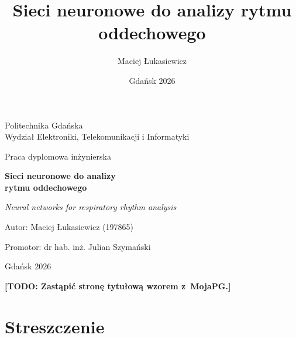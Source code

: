 \documentclass[12pt,a4paper,oneside]{report}
\title{Sieci neuronowe do analizy rytmu oddechowego}
\author{Maciej Łukasiewicz}
\date{Gdańsk 2026}
\newcommand{\todo}[1]{\textcolor{red!75!black}{\textbf{[TODO: #1]}}}
\begin{document}
\begin{titlepage}
    \centering
    {\large Politechnika Gdańska\\[0.2em]
    Wydział Elektroniki, Telekomunikacji i Informatyki\par}
    \vspace{3.5cm}

    {\large Praca dyplomowa inżynierska\par}
    \vspace{1.2cm}
    {\LARGE\bfseries Sieci neuronowe do analizy\\[0.3em] rytmu oddechowego\par}
    \vspace{0.8cm}
    {\large\itshape Neural networks for respiratory rhythm analysis\par}
    \vspace{3cm}

    {\large Autor: Maciej Łukasiewicz (197865)\par}
    \vspace{0.4cm}
    {\large Promotor: dr hab. inż. Julian Szymański\par}
    \vfill
    {\large Gdańsk 2026\par}
    \vspace{0.5cm}
    {\footnotesize\todo{Zastąpić stronę tytułową wzorem z~MojaPG.}\par}
\end{titlepage}

\chapter*{Streszczenie}
\end{document}
